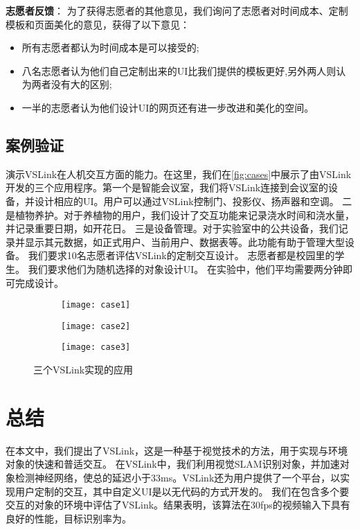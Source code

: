 \textbf{志愿者反馈}：
为了获得志愿者的其他意见，我们询问了志愿者对时间成本、定制模板和页面美化的意见，获得了以下意见：
\begin{itemize}
  \item 所有志愿者都认为时间成本是可以接受的;
  \item 八名志愿者认为他们自己定制出来的UI比我们提供的模板更好,另外两人则认为两者没有大的区别;
  \item 一半的志愿者认为他们设计UI的网页还有进一步改进和美化的空间。
\end{itemize}



\section{案例验证}
演示VSLink在人机交互方面的能力。在这里，我们在\autoref{fig:cases}中展示了由VSLink开发的三个应用程序。第一个是智能会议室，我们将VSLink连接到会议室的设备，并设计相应的UI。用户可以通过VSLink控制门、投影仪、扬声器和空调。
二是植物养护。对于养植物的用户，我们设计了交互功能来记录浇水时间和浇水量，并记录重要日期，如开花日。
三是设备管理。对于实验室中的公共设备，我们记录并显示其元数据，如正式用户、当前用户、数据表等。此功能有助于管理大型设备。
我们要求10名志愿者评估VSLink的定制交互设计。
志愿者都是校园里的学生。
我们要求他们为随机选择的对象设计UI。
在实验中，他们平均需要两分钟即可完成设计。

\begin{figure}[htb]
	\centering
	\begin{subfigure}{.65\linewidth}
		\texttt{[image: case1]}
		\caption{}
	\end{subfigure}
	\begin{subfigure}{.65\linewidth}
		\texttt{[image: case2]}
		\caption{}
	\end{subfigure}
	\begin{subfigure}{.65\linewidth}
		\texttt{[image: case3]}
		\caption{}
	\end{subfigure}
	\caption{三个VSLink实现的应用}\label{fig:cases}
\end{figure}




\chapter{总结}
\label{chap:sum}
在本文中，我们提出了VSLink，这是一种基于视觉技术的方法，用于实现与环境对象的快速和普适交互。
在VSLink中，我们利用视觉SLAM识别对象，并加速对象检测神经网络，使总的延迟小于33ms。VSLink还为用户提供了一个平台，以实现用户定制的交互，其中自定义UI是以无代码的方式开发的。
我们在包含多个要交互的对象的环境中评估了VSLink。结果表明，该算法在30fps的视频输入下具有良好的性能，目标识别率为{\acc}。

